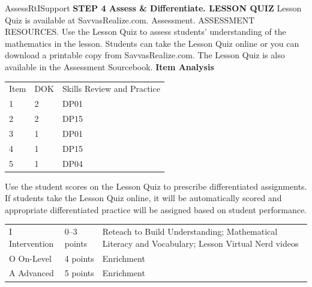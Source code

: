 \documentclass{article}
\newenvironment{te-addendum}[2]{}{}     %
\begin{document}
\begin{te-addendum}{Assess}{RtISupport}
\textbf{STEP 4 Assess \& Differentiate. LESSON QUIZ}
Lesson Quiz is available at SavvasRealize.com. Assessment. ASSESSMENT RESOURCES.
Use the Lesson Quiz to assess students' understanding of the mathematics in the lesson.
Students can take the Lesson Quiz online or you can download a printable copy from SavvasRealize.com. The Lesson Quiz is also available in the Assessment Sourcebook.
\textbf{Item Analysis}
\begin{tabular}{lll}
Item & DOK & Skills Review and Practice \\
1 & 2 & DP01 \\
2 & 2 & DP15 \\
3 & 1 & DP01 \\
4 & 1 & DP15 \\
5 & 1 & DP04 \\
\end{tabular}
Use the student scores on the Lesson Quiz to prescribe differentiated assignments.
If students take the Lesson Quiz online, it will be automatically scored and appropriate differentiated practice will be assigned based on student performance.
\begin{tabular}{lll}
I Intervention & 0--3 points & Reteach to Build Understanding; Mathematical Literacy and Vocabulary; Lesson Virtual Nerd videos \\
O On-Level & 4 points & Enrichment \\
A Advanced & 5 points & Enrichment \\
\end{tabular}
\end{te-addendum}
\end{document}
